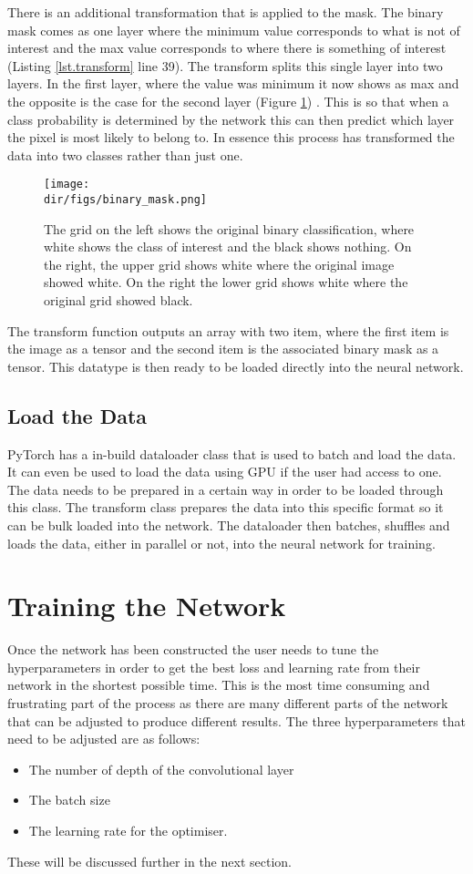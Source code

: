 There is an additional transformation that is applied to the mask. The binary mask comes as one layer where the minimum value corresponds to what is not of interest and the max value corresponds to where there is something of interest (Listing \ref{lst.transform} line 39). The transform splits this single layer into two layers. In the first layer, where the value was minimum it now shows as max and the opposite is the case for the second layer (Figure \ref{fig.binary_mask}) . This is so that when a class probability is determined by the network this can then predict which layer the pixel is most likely to belong to. In essence this process has transformed the data into two classes rather than just one.
\begin{figure}[H]
    \centering
    \texttt{[image: \\dir/figs/binary\_mask.png]}
    \caption[Binary Mask]{The grid on the left shows the original binary classification, where white shows the class of interest and the black shows nothing. On the right, the upper grid shows white where the original image showed white. On the right the lower grid shows white where the original grid showed black.}
    \label{fig.binary_mask}
\end{figure}
The transform function outputs an array with two item, where the first item is the image as a tensor and the second item is the associated binary mask as a tensor. This datatype is then ready to be loaded directly into the neural network.
\subsection{Load the Data}
PyTorch has a in-build dataloader class that is used to batch and load the data. It can even be used to load the data using GPU if the user had access to one. The data needs to be prepared in a certain way in order to be loaded through this class. The transform class prepares the data into this specific format so it can be bulk loaded into the network. The dataloader then batches, shuffles and loads the data, either in parallel or not, into the neural network for training. 

\section{Training the Network}
Once the network has been constructed the user needs to tune the hyperparameters in order to get the best loss and learning rate from their network in the shortest possible time. This is the most time consuming and frustrating part of the process as there are many different parts of the network that can be adjusted to produce different results. The three hyperparameters that need to be adjusted are as follows:
\begin{itemize}
    \item The number of depth of the convolutional layer
    \item The batch size
    \item The learning rate for the optimiser.
\end{itemize}
These will be discussed further in the next section.
